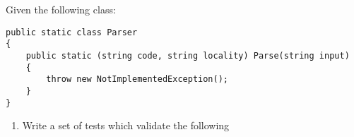 Given the following class:
\begin{lstlisting}
public static class Parser
{
    public static (string code, string locality) Parse(string input)
    {
        throw new NotImplementedException();
    }
} 
\end{lstlisting}

\begin{enumerate}
    \item {} Write a set of tests which validate the following
        
\end{enumerate}